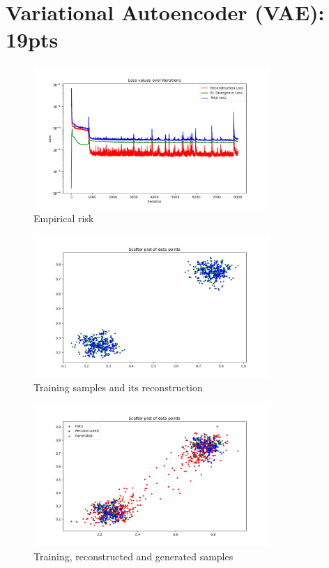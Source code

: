 \documentclass[12pt]{article}
\begin{document}
\section{Variational Autoencoder (VAE): 19pts}
\begin{figure}[H]
    \centering
    \includegraphics[width=0.8\textwidth]{../img/Figure_2.png}
    \caption{Empirical risk}
\end{figure}

\begin{figure}[H]
    \centering
    \includegraphics[width=0.8\textwidth]{../img/Figure_1.png}
    \caption{Training samples and its reconstruction}
\end{figure}

\begin{figure}[H]
    \centering
    \includegraphics[width=0.8\textwidth]{../img/Figure_3.png}
    \caption{Training, reconstructed and generated samples}
\end{figure}
\end{document}
